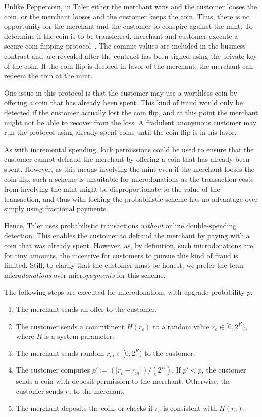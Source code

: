 \documentclass{llncs}
\begin{document}
Unlike Peppercoin, in Taler either the merchant wins and the customer
looses the coin, or the merchant looses and the customer keeps the
coin.  Thus, there is no opportunity for the merchant and the customer
to conspire against the mint.  To determine if the coin is to be
transferred, merchant and customer execute a secure coin flipping
protocol~\cite{blum1981}.  The commit values are included in the
business contract and are revealed after the contract has been signed
using the private key of the coin.  If the coin flip is decided in
favor of the merchant, the merchant can redeem the coin at the mint.

One issue in this protocol is that the customer may use a worthless
coin by offering a coin that has already been spent.  This kind of
fraud would only be detected if the customer actually lost the coin
flip, and at this point the merchant might not be able to recover from
the loss.  A fradulent anonymous customer may run the protocol using
already spent coins until the coin flip is in his favor.

As with incremental spending, lock permissions could be used to ensure
that the customer cannot defraud the merchant by offering a coin that
has already been spent.  However, as this means involving the mint
even if the merchant looses the coin flip, such a scheme is unsuitable
for microdonations as the transaction costs from involving the mint
might be disproportionate to the value of the transaction, and thus
with locking the probabilistic scheme has no advantage over simply
using fractional payments.

Hence, Taler uses probabilistic transactions {\em without} online
double-spending detection.  This enables the customer to defraud the
merchant by paying with a coin that was already spent.  However, as,
by definition, such microdonations are for tiny amounts, the incentive
for customers to pursue this kind of fraud is limited.  Still, to
clarify that the customer must be honest, we prefer the term
micro{\em donations} over micro{\em payments} for this scheme.


The following steps are executed for microdonations with upgrade probability $p$:
\begin{enumerate}
  \item The merchant sends an offer to the customer.
  \item The customer sends a commitment $H(r_c)$ to a random
    value $r_c \in [0,2^R)$, where $R$ is a system parameter.
  \item The merchant sends random $r_m \in [0,2^R)$ to the customer.
    \item The customer computes $p' := (|r_c - r_m|) / (2^R)$.
    If $p' < p$, the customer sends a coin with deposit-permission to the merchant.
    Otherwise, the customer sends $r_c$ to the merchant.
  \item The merchant deposits the coin, or checks if $r_c$ is consistent
    with $H(r_c)$.
\end{enumerate}
\end{document}
